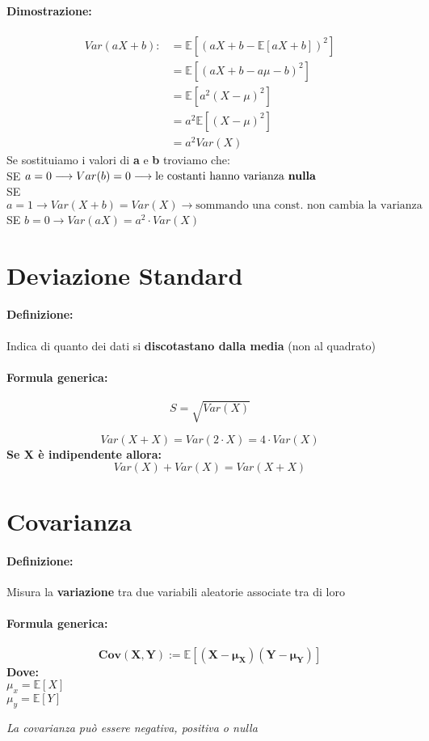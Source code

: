 \documentclass[]{article}
\newcommand{\ev}{\mathbb{E}[X]}
\renewcommand{\ev}[1]{\mathbb{E}[#1]}
\newcommand{\definizione}{\paragraph{Definizione:}}
\newcommand{\formula}{\paragraph{Formula generica:}}
\begin{document}
    \paragraph{Dimostrazione:}
    \begin{equation*}
        \begin{split}
            Var(aX + b) :&= \ev{(aX + b - \ev{aX + b})^2} \\
            & = \ev{(aX + b -a\mu - b)^2} \\
            & = \ev{a^2(X-\mu)^2} \\
            & = a^2 \ev{(X - \mu)^2} \\
            & = a^2 Var(X)
        \end{split}
    \end{equation*}
    Se sostituiamo i valori di \textbf{a} e \textbf{b} troviamo che: \\
    SE $a = 0 \longrightarrow Var(b) = 0 \longrightarrow \text{le costanti hanno varianza \textbf{nulla}}$ \\
    SE $a = 1 \longrightarrow Var(X + b) = Var(X) \longrightarrow \text{sommando una const. non cambia la varianza}$ \\
    SE $b = 0 \longrightarrow Var(aX) = a^2 \cdot Var(X)$ \\
    

    \newpage
    \section{Deviazione Standard}
    \definizione Indica di quanto dei dati si \textbf{discotastano dalla media} (non al quadrato)

    \formula \[ S = \sqrt{Var(X)} \]

    \[ Var(X + X) = Var(2 \cdot X) = 4 \cdot Var(X) \]
    \linebreak[1]
    \textbf{Se X è indipendente allora:}
    \[ Var(X) + Var(X) = Var(X + X) \]

    \newpage
    \section{Covarianza}
    \definizione Misura la \textbf{variazione} tra due variabili aleatorie associate tra di loro
    \formula \[ \boldsymbol{Cov(X,Y) := \ev{(X - \mu_X) (Y - \mu_Y)}} \]
    \textbf{Dove:} \\
    $ \mu_x = \ev{X} $ \\
    $ \mu_y = \ev{Y} $ \\
    \linebreak[4]
    \centerline{\textit{La covarianza può essere negativa, positiva o nulla } }
     \\
     \\
     \\
\end{document}
